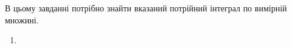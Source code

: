 \item  В цьому завданні потрібно знайти вказаний потрійний інтеграл по вимірній множині.
\begin{enumerate}[label*=\arabic*.]
\item
\end{enumerate}
